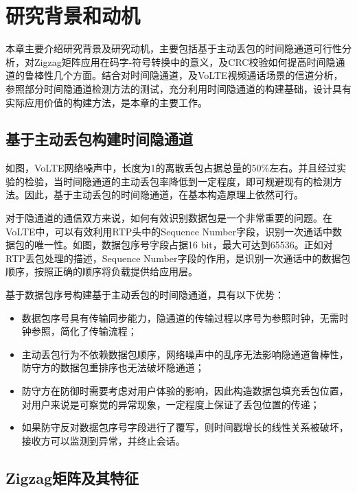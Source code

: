 \section{研究背景和动机}
\label{chap:zigzag:motivation}

本章主要介绍研究背景及研究动机，主要包括基于主动丢包的时间隐通道可行性分析，对Zigzag矩阵应用在码字-符号转换中的意义，及CRC校验如何提高时间隐通道的鲁棒性几个方面。结合对时间隐通道，及VoLTE视频通话场景的信道分析，参照部分时间隐通道检测方法的测试，充分利用时间隐通道的构建基础，设计具有实际应用价值的构建方法，是本章的主要工作。

\subsection{基于主动丢包构建时间隐通道}
\label{chap:zigzag:motivation:dropout}
如图，VoLTE网络噪声中，长度为1的离散丢包占据总量的50\%左右。并且经过实验的检验，当时间隐通道的主动丢包率降低到一定程度，即可规避现有的检测方法。因此，基于主动丢包的时间隐通道，在基本构造原理上依然可行。

对于隐通道的通信双方来说，如何有效识别数据包是一个非常重要的问题。在VoLTE中，可以有效利用RTP头中的Sequence Number字段，识别一次通话中数据包的唯一性。如图，数据包序号字段占据16 bit，最大可达到65536。正如对RTP丢包处理的描述，Sequence Number字段的作用，是识别一次通话中的数据包顺序，按照正确的顺序将负载提供给应用层。

基于数据包序号构建基于主动丢包的时间隐通道，具有以下优势：
\begin{itemize}
    \item 数据包序号具有传输同步能力，隐通道的传输过程以序号为参照时钟，无需时钟参照，简化了传输流程；
    \item 主动丢包行为不依赖数据包顺序，网络噪声中的乱序无法影响隐通道鲁棒性，防守方的数据包重排序也无法破坏隐通道；
    \item 防守方在防御时需要考虑对用户体验的影响，因此构造数据包填充丢包位置，对用户来说是可察觉的异常现象，一定程度上保证了丢包位置的传递；
    \item 如果防守反对数据包序号字段进行了覆写，则时间戳增长的线性关系被破坏，接收方可以监测到异常，并终止会话。
\end{itemize}

\subsection{Zigzag矩阵及其特征}
\label{chap:zigzag:motivation:zigzag}

